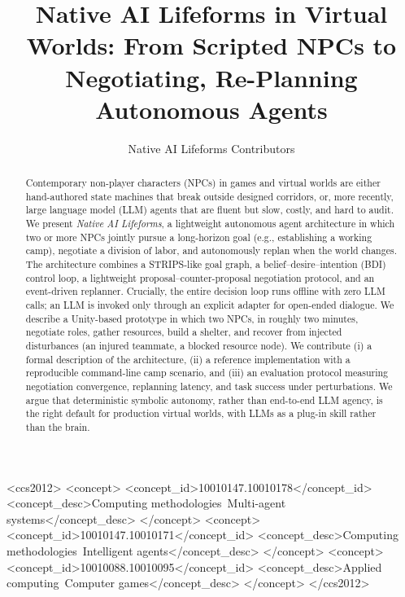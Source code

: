 \documentclass[sigconf, authorversion]{acmart}
\title{Native AI Lifeforms in Virtual Worlds: From Scripted NPCs to Negotiating, Re-Planning Autonomous Agents}
\author{Native AI Lifeforms Contributors}
\affiliation{\institution{Open Source Project}}
\begin{document}
\maketitle

\begin{abstract}
Contemporary non-player characters (NPCs) in games and virtual worlds are
either hand-authored state machines that break outside designed corridors,
or, more recently, large language model (LLM) agents that are fluent but
slow, costly, and hard to audit. We present \emph{Native AI Lifeforms}, a
lightweight autonomous agent architecture in which two or more NPCs jointly
pursue a long-horizon goal (e.g., establishing a working camp), negotiate a
division of labor, and autonomously replan when the world changes. The
architecture combines a STRIPS-like goal graph, a belief--desire--intention
(BDI) control loop, a lightweight proposal--counter-proposal negotiation
protocol, and an event-driven replanner. Crucially, the entire decision loop
runs offline with zero LLM calls; an LLM is invoked only through an
explicit adapter for open-ended dialogue. We describe a Unity-based
prototype in which two NPCs, in roughly two minutes, negotiate roles,
gather resources, build a shelter, and recover from injected disturbances
(an injured teammate, a blocked resource node). We contribute (i) a formal
description of the architecture, (ii) a reference implementation with a
reproducible command-line camp scenario, and (iii) an evaluation protocol
measuring negotiation convergence, replanning latency, and task success
under perturbations. We argue that deterministic symbolic autonomy, rather
than end-to-end LLM agency, is the right default for production virtual
worlds, with LLMs as a plug-in skill rather than the brain.
\end{abstract}

\begin{CCSXML}
<ccs2012>
<concept>
<concept_id>10010147.10010178</concept_id>
<concept_desc>Computing methodologies~Multi-agent systems</concept_desc>
</concept>
<concept>
<concept_id>10010147.10010171</concept_id>
<concept_desc>Computing methodologies~Intelligent agents</concept_desc>
</concept>
<concept>
<concept_id>10010088.10010095</concept_id>
<concept_desc>Applied computing~Computer games</concept_desc>
</concept>
</ccs2012>
\end{CCSXML}

\end{document}
